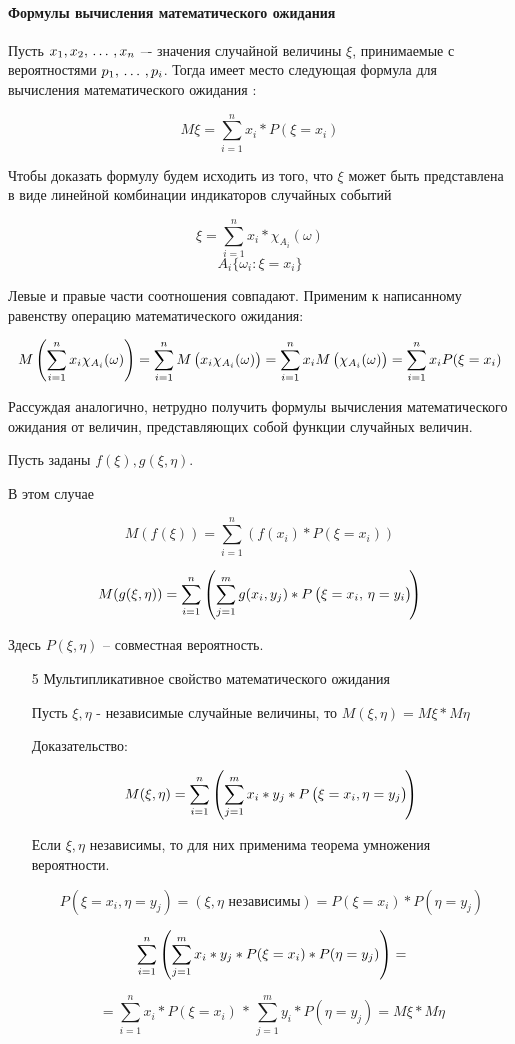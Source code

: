 ﻿\documentclass[a4paper,12pt]{report}
\begin{document}
\paragraph{Формулы вычисления математического ожидания}

	Пусть $x_1,x_2, \,\ldots\, ,x_n$ –-  значения случайной величины $\xi$, принимаемые с вероятностями $p_1, \,\ldots\, ,p_i$. Тогда имеет место следующая формула для вычисления математического ожидания :

	$$
	  M\xi=\sum^n_{i=1}x_i*P(\xi=x_i)
	$$

	Чтобы доказать формулу будем исходить из того, что $\xi$ может быть представлена в виде линейной комбинации индикаторов случайных событий

	$$
	  \xi = \sum^n_{i=1}x_i*\chi_{A_i}(\omega)
	$$ $$
	  A_i \{\omega_i : \xi = x_i\}
	$$

	Левые и правые части соотношения совпадают. Применим к написанному равенству операцию математического ожидания: 

	$$	
	  M\left(\sum^n_{i=1}x_i\chi_{A_i}(\omega)\right) 
	    = \sum^n_{i=1}M\left(x_i\strut\chi_{A_i}(\omega)\right) 
	    = \sum^n_{i=1}x_iM\left(\strut\chi_{A_i}(\omega)\right) 
	    = \sum^n_{i=1}x_iP(\xi=x_i)	
	$$

	Рассуждая аналогично, нетрудно получить формулы вычисления математического ожидания от величин, представляющих собой функции случайных величин. 

	Пусть заданы $f(\xi),g(\xi,\eta)$.

	В этом случае 

	$$
	  M(f(\xi)) = \sum^n_{i=1}\left(f(x_i)*P(\xi=x_i)\right) 
	$$

	$$
	  M(g(\xi,\eta)) = \sum^n_{i=1}
	    \left(   
	      \sum^m_{j=1}g(x_i,y_j)*P
	        \left(
	          \xi=x_i,\strut\,\eta=y_i
	        \right) \!
	    \right) 
	$$

	Здесь $P(\xi,\eta)$ – совместная вероятность.


	\begin{enumerate}

	\item[5] Мультипликативное свойство математического ожидания

		Пусть $\xi,\eta$ - независимые случайные величины, то $M(\xi,\eta) =  M\xi * M\eta$

		Доказательство:

		$$
		  M(\xi,\eta) = \sum^n_{i=1}
		    \left(
		      \sum^m_{j=1}x_i*y_j*\strut P
		        \left(
		          \xi=x_i,\strut\eta=y_j
		        \right) \!
		    \right)
		$$

		Если $\xi,\eta$ независимы, то для них применима теорема умножения вероятности. 

		$$
		  P(\xi=x_i,\eta=y_j) 
		    = (\xi,\eta \mbox{ независимы})
		    = P(\xi=x_i)*P(\eta=y_j)
		$$
		
		$$
		  \sum^n_{i=1}
		    \left(
		      \sum^m_{j=1}x_i*y_j*\strut P(\xi=x_i)*P(\eta=y_j)
		    \right)
		  =
		$$
		
		$$
		  = \sum^n_{i=1}x_i*P(\xi=x_i)  \, * \, 
		    \sum^m_{j=1}y_i*P(\eta=y_j) 
		  = M\xi*M\eta
		$$

	\end{enumerate}
\end{document}
